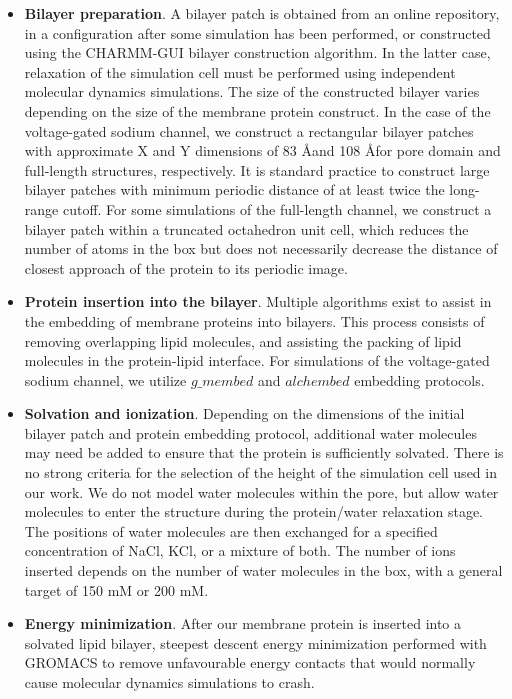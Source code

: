 \begin{refsection}
\begin{itemize}
\item \textbf{Bilayer preparation}. A bilayer patch is obtained from an online repository, in a configuration after some simulation has been performed, or constructed using the CHARMM-GUI bilayer construction algorithm. In the latter case, relaxation of the simulation cell must be performed using independent molecular dynamics simulations. The size of the constructed bilayer varies depending on the size of the membrane protein construct. In the case of the voltage-gated sodium channel, we construct a rectangular bilayer patches with approximate X and Y dimensions of 83 \AA and 108 \AA for pore domain and full-length structures, respectively. It is standard practice to construct large bilayer patches with minimum periodic distance of at least twice the long-range cutoff. For some simulations of the full-length channel, we construct a bilayer patch within a truncated octahedron unit cell, which reduces the number of atoms in the box but does not necessarily decrease the distance of closest approach of the protein to its periodic image.
\item \textbf{Protein insertion into the bilayer}. Multiple algorithms exist to assist in the embedding of membrane proteins into bilayers. This process consists of removing overlapping lipid molecules, and assisting the packing of lipid molecules in the protein-lipid interface. For simulations of the voltage-gated sodium channel, we utilize $g\_membed$ \cite{Wolf:2010dr} and $alchembed$ \cite{Jefferys:2015jt} embedding protocols.
\item \textbf{Solvation and ionization}. Depending on the dimensions of the initial bilayer patch and protein embedding protocol, additional  water molecules may need be added to ensure that the protein is sufficiently solvated. There is no strong criteria for the selection of the height of the simulation cell used in our work. We do not model water molecules within the pore, but allow water molecules to enter the structure during the protein/water relaxation stage. The positions of water molecules are then exchanged for a specified concentration of NaCl, KCl, or a mixture of both. The number of ions inserted depends on the number of water molecules in the box, with a general target of 150 mM or 200 mM.
\item \textbf{Energy minimization}. After our membrane protein is inserted into a solvated lipid bilayer, steepest descent energy minimization performed with GROMACS\cite{Abraham:2015gj,Hess:2008db,Pronk:2013ef}  to remove unfavourable energy contacts that would normally cause molecular dynamics simulations to crash.

\end{itemize}
\end{refsection}
